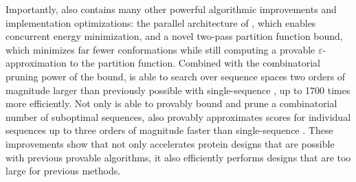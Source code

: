 Importantly, \bbks also contains many other powerful algorithmic improvements and implementation optimizations: the parallel architecture of \bbks, which enables concurrent energy minimization, and a novel two-pass partition function bound, which minimizes far fewer conformations while still computing a provable $\varepsilon$-approximation to the partition function. Combined with the combinatorial pruning power of the \msbound bound, \bbks is able to search over sequence spaces two orders of magnitude larger than previously possible with single-sequence \ks, up to 1700 times more efficiently. Not only is \bbks able to provably bound and prune a combinatorial number of suboptimal sequences, \bbks also provably approximates \ks scores for individual sequences up to three orders of magnitude faster than single-sequence \ks. These improvements show that \bbks not only accelerates protein designs that are possible with previous provable algorithms, it also efficiently performs designs that are too large for previous methods.